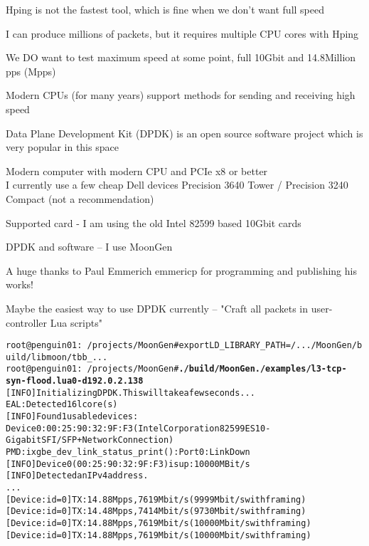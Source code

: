 \documentclass[Screen16to9,17pt]{foils}
\begin{document}
\begin{list2}
\item Hping is not the fastest tool, which is fine when we don't want full speed
\item I can produce millions of packets, but it requires multiple CPU cores with Hping
\item We DO want to test maximum speed at some point, full 10Gbit and 14.8Million pps (Mpps)
\item Modern CPUs (for many years) support methods for sending and receiving high speed
\item Data Plane Development Kit (DPDK) is an open source software project which is very popular in this space \\
\end{list2}




\begin{list2}
\item Modern computer with modern CPU and PCIe x8 or better\\
I currently use a few cheap Dell devices Precision 3640 Tower / Precision 3240 Compact (not a recommendation)
\item Supported card - I am using the old Intel 82599 based 10Gbit cards
\item DPDK and software -- I use MoonGen 
\item A huge thanks to Paul Emmerich emmericp for programming and publishing his works!
\item Maybe the easiest way to use DPDK currently -- "Craft all packets in user-controller Lua scripts"
\end{list2}



\begin{alltt}\footnotesize
root@penguin01:~/projects/MoonGen# export LD_LIBRARY_PATH=/.../MoonGen/build/libmoon/tbb_...
root@penguin01:~/projects/MoonGen# {\bf ./build/MoonGen ./examples/l3-tcp-syn-flood.lua 0 -d 192.0.2.138}
[INFO]  Initializing DPDK. This will take a few seconds...
EAL: Detected 16 lcore(s)
[INFO]  Found 1 usable devices:
   Device 0: 00:25:90:32:9F:F3 (Intel Corporation 82599ES 10-Gigabit SFI/SFP+ Network Connection)
PMD: ixgbe_dev_link_status_print():  Port 0: Link Down
[INFO]  Device 0 (00:25:90:32:9F:F3) is up: 10000 MBit/s
[INFO]  Detected an IPv4 address.
...
[Device: id=0] TX: 14.88 Mpps, 7619 Mbit/s (9999 Mbit/s with framing)
[Device: id=0] TX: 14.48 Mpps, 7414 Mbit/s (9730 Mbit/s with framing)
[Device: id=0] TX: 14.88 Mpps, 7619 Mbit/s (10000 Mbit/s with framing)
[Device: id=0] TX: 14.88 Mpps, 7619 Mbit/s (10000 Mbit/s with framing)
\end{alltt}
\end{document}

